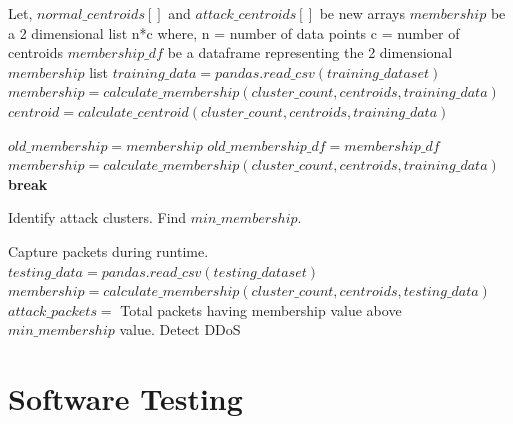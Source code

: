\documentclass[12pt,a4paper,final]{report}
\begin{document}
\begin{algorithm}
\begin{algorithmic}[1]
\State Let, $normal\_centroids[]$ and $attack\_centroids[]$ be new arrays
\State $ membership $ be a 2 dimensional list n*c
\newline
\hspace*{1cm}
where, 
\newline
\hspace*{1cm}
n = number of data points
\newline
\hspace*{1cm}
c = number of centroids
\State $ membership\_df $ be a dataframe representing the 2 dimensional $membership$ list
\State $training\_data = pandas.read\_csv(training\_dataset)$
\State $membership = calculate\_membership(cluster\_count, centroids, training\_data)$
\State $centroid = calculate\_centroid(cluster\_count, centroids, training\_data)$

\State $old\_membership = membership$
\State $old\_membership\_df = membership\_df$
\State $membership = calculate\_membership(cluster\_count, centroids, training\_data)$
\State \textbf{break}
\EndIf
\EndWhile

\State Identify attack clusters.
\State Find $min\_membership$.

\State Capture packets during runtime.
\State $testing\_data = pandas.read\_csv(testing\_dataset)$
\State $membership = calculate\_membership(cluster\_count, centroids, testing\_data)$
\State $attack\_packets = $ Total packets having membership value above $min\_membership$ value.
\State Detect DDoS
\EndIf
\EndWhile
\EndFunction
\end{algorithmic}
\end{algorithm}

\begin{minipage}{\textwidth}
\end{minipage}

\newpage
{}
\chapter{Software Testing}
\thispagestyle{empty}
\newpage
\end{document}
